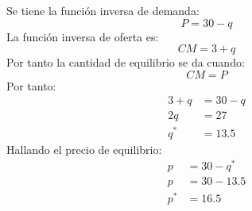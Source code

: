 Se tiene la función inversa de demanda:  
		$$P = 30-q$$
La función inversa de oferta es:
		$$CM = 3 + q$$
Por tanto la cantidad de equilibrio se da cuando:
		$$CM = P$$
Por tanto:
	\begin{align*}
		3+q &= 30-q\\
		2q &= 27\\
		q^* &= 13.5
	\end{align*}
Hallando el precio de equilibrio:
	\begin{align*}
		p &= 30-q^*\\
		p &= 30-13.5\\
		p^* &= 16.5
	\end{align*}